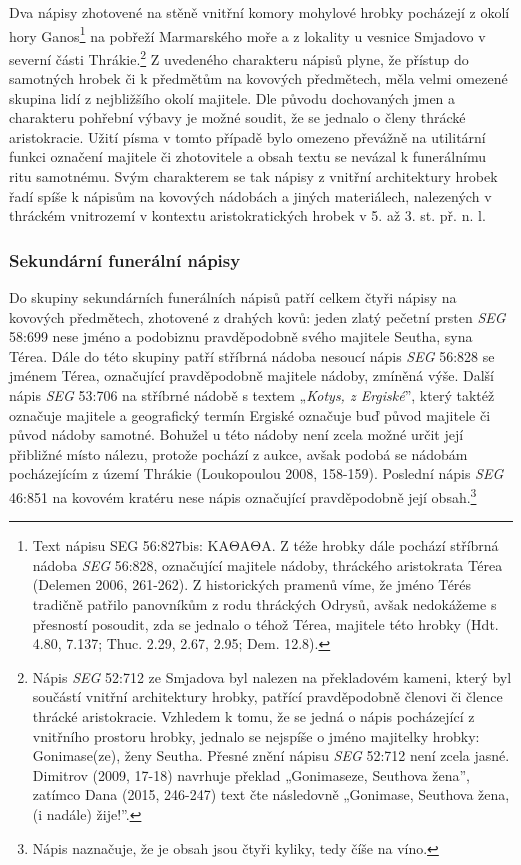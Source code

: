 Dva nápisy zhotovené na stěně vnitřní komory mohylové hrobky pocházejí z okolí hory Ganos\footnote{Text nápisu SEG 56:827bis: ΚΑΘΑΘΑ. Z téže hrobky dále pochází stříbrná nádoba {\em SEG} 56:828, označující majitele nádoby, thráckého aristokrata Térea (Delemen 2006, 261-262). Z historických pramenů víme, že jméno Térés tradičně patřilo panovníkům z rodu thráckých Odrysů, avšak nedokážeme s přesností posoudit, zda se jednalo o téhož Térea, majitele této hrobky (Hdt. 4.80, 7.137; Thuc. 2.29, 2.67, 2.95; Dem. 12.8).} na pobřeží Marmarského moře a z lokality u vesnice Smjadovo v severní části Thrákie.\footnote{Nápis {\em SEG} 52:712 ze Smjadova byl nalezen na překladovém kameni, který byl součástí vnitřní architektury hrobky, patřící pravděpodobně členovi či člence thrácké aristokracie. Vzhledem k tomu, že se jedná o nápis pocházející z vnitřního prostoru hrobky, jednalo se nejspíše o jméno majitelky hrobky: Gonimase(ze), ženy Seutha. Přesné znění nápisu {\em SEG} 52:712 není zcela jasné. Dimitrov (2009, 17-18) navrhuje překlad „Gonimaseze, Seuthova žena”, zatímco Dana (2015, 246-247) text čte následovně „Gonimase, Seuthova žena, (i nadále) žije!”.} Z uvedeného charakteru nápisů plyne, že přístup do samotných hrobek či k předmětům na kovových předmětech, měla velmi omezené skupina lidí z nejbližšího okolí majitele. Dle původu dochovaných jmen a charakteru pohřební výbavy je možné soudit, že se jednalo o členy thrácké aristokracie. Užití písma v tomto případě bylo omezeno převážně na utilitární funkci označení majitele či zhotovitele a obsah textu se nevázal k funerálnímu ritu samotnému. Svým charakterem se tak nápisy z vnitřní architektury hrobek řadí spíše k nápisům na kovových nádobách a jiných materiálech, nalezených v thráckém vnitrozemí v kontextu aristokratických hrobek v 5. až 3. st. př. n. l.

\subsubsection[sekundární-funerální-nápisy-1]{Sekundární funerální nápisy}

Do skupiny sekundárních funerálních nápisů patří celkem čtyři nápisy na kovových předmětech, zhotovené z drahých kovů: jeden zlatý pečetní prsten {\em SEG} 58:699 nese jméno a podobiznu pravděpodobně svého majitele Seutha, syna Térea. Dále do této skupiny patří stříbrná nádoba nesoucí nápis {\em SEG} 56:828 se jménem Térea, označující pravděpodobně majitele nádoby, zmíněná výše. Další nápis {\em SEG} 53:706 na stříbrné nádobě s textem „{\em Kotys, z Ergiské}”, který taktéž označuje majitele a geografický termín Ergiské označuje buď původ majitele či původ nádoby samotné. Bohužel u této nádoby není zcela možné určit její přibližné místo nálezu, protože pochází z aukce, avšak podobá se nádobám pocházejícím z území Thrákie (Loukopoulou 2008, 158-159). Poslední nápis {\em SEG} 46:851 na kovovém kratéru nese nápis označující pravděpodobně její obsah.\footnote{Nápis naznačuje, že je obsah jsou čtyři kyliky, tedy číše na víno.}

